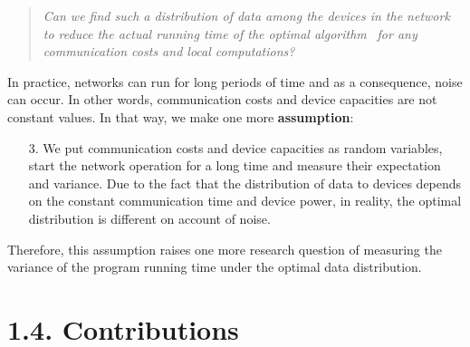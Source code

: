 \documentclass{article}
\theoremstyle{definition}
\theoremstyle{plain}
\begin{document}
\begin{quote}
    \textit{ Can we find such a distribution of data among the devices in the network to reduce the actual running time of the optimal algorithm} \cite{kovalev2022optimal}\textit{~for any communication costs and local computations?}
\end{quote}


In practice, networks can run for long periods of time and as a consequence, noise can occur. In other words, communication costs and device capacities are not constant values. In that way, we make one more \textbf{assumption}:
\begin{itemize}
    \item [3.] We put communication costs and device capacities as random variables, start the network operation for a long time and measure their expectation and variance. Due to the fact that the distribution of data to devices depends on the constant communication time and device power, in reality, the optimal distribution is different on account of noise. 
\end{itemize}

Therefore, this assumption raises one more research question of measuring the variance of the program running time under the optimal data distribution.

\section*{1.4. Contributions}
\end{document}
